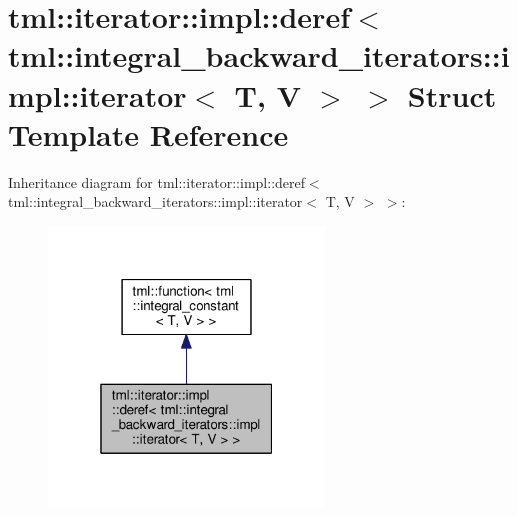 \hypertarget{structtml_1_1iterator_1_1impl_1_1deref_3_01tml_1_1integral__backward__iterators_1_1impl_1_1iterator_3_01_t_00_01_v_01_4_01_4}{\section{tml\+:\+:iterator\+:\+:impl\+:\+:deref$<$ tml\+:\+:integral\+\_\+backward\+\_\+iterators\+:\+:impl\+:\+:iterator$<$ T, V $>$ $>$ Struct Template Reference}
\label{structtml_1_1iterator_1_1impl_1_1deref_3_01tml_1_1integral__backward__iterators_1_1impl_1_1iterator_3_01_t_00_01_v_01_4_01_4}
}


Inheritance diagram for tml\+:\+:iterator\+:\+:impl\+:\+:deref$<$ tml\+:\+:integral\+\_\+backward\+\_\+iterators\+:\+:impl\+:\+:iterator$<$ T, V $>$ $>$\+:
\nopagebreak
\begin{figure}[H]
\begin{center}
\leavevmode
\includegraphics[width=208pt]{structtml_1_1iterator_1_1impl_1_1deref_3_01tml_1_1integral__backward__iterators_1_1impl_1_1itera155d410d618c089e6e35adfcd9d8d16b}
\end{center}
\end{figure}


